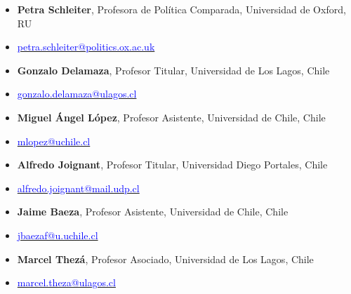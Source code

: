 \begin{publications}

\begin{itemize}
\item[]{\small {\bfseries Petra Schleiter}, Profesora de Política Comparada, Universidad de Oxford, RU}
\item[]{\vspace{-1mm}\textcolor{oxfordblue}{\faEnvelope} \hspace{0.1mm} {\small \href{mailto:petra.schleiter@politics.ox.ac.uk}{\textcolor{blue}{petra.schleiter@politics.ox.ac.uk}}}} \vspace{1.5mm}
\item[]{\small {\bfseries Gonzalo Delamaza}, Profesor Titular, Universidad de Los Lagos, Chile}
\item[]{\vspace{-1mm}\textcolor{oxfordblue}{\faEnvelope} \hspace{0.1mm} {\small \href{mailto:gonzalo.delamaza@ulagos.cl}{\textcolor{blue}{gonzalo.delamaza@ulagos.cl}}}} \vspace{1.5mm}
\item[]{\small {\bfseries Miguel \'Angel L\'opez}, Profesor Asistente, Universidad de Chile, Chile}
\item[]{\vspace{-1mm}\textcolor{oxfordblue}{\faEnvelope} \hspace{0.1mm} {\small \href{mailto:mlopez@uchile.cl}{\textcolor{blue}{mlopez@uchile.cl}}}}  \pagebreak %
\item[]{\small {\bfseries Alfredo Joignant}, Profesor Titular, Universidad Diego Portales, Chile}
\item[]{\vspace{-1mm}\textcolor{oxfordblue}{\faEnvelope} \hspace{0.1mm} {\small \href{mailto:alfredo.joignant@mail.udp.cl}{\textcolor{blue}{alfredo.joignant@mail.udp.cl}}}} \vspace{1.5mm}
\item[]{\small {\bfseries Jaime Baeza}, Profesor Asistente, Universidad de Chile, Chile}
\item[]{\vspace{-1mm}\textcolor{oxfordblue}{\faEnvelope} \hspace{0.1mm} {\small \href{mailto:jbaezaf@u.uchile.cl}{\textcolor{blue}{jbaezaf@u.uchile.cl}}}} \vspace{1.5mm}
\item[]{\small {\bfseries Marcel Thez\'a}, Profesor Asociado, Universidad de Los Lagos, Chile}
\item[]{\vspace{-1mm}\textcolor{oxfordblue}{\faEnvelope} \hspace{0.1mm} {\small \href{mailto:marcel.theza@ulagos.cl}{\textcolor{blue}{marcel.theza@ulagos.cl}}}} \vspace{1.5mm}
\end{itemize}

\end{publications}
